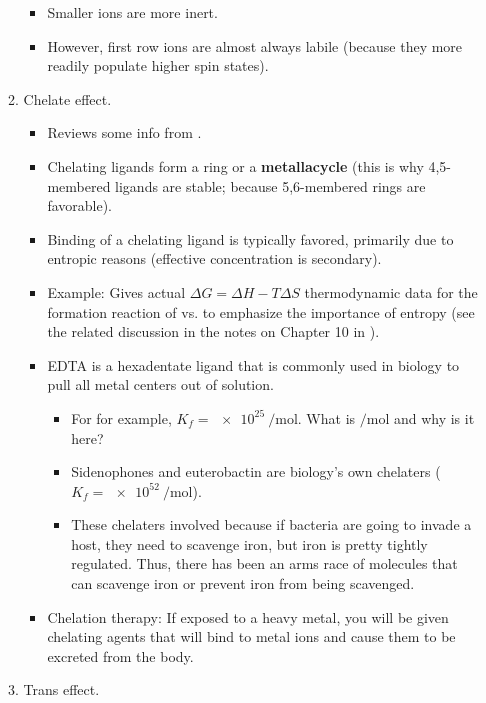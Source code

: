 \documentclass[../notes.tex]{subfiles}
\begin{document}
\begin{itemize}
\begin{enumerate}
\begin{itemize}
            \item Smaller ions are more inert.
            \item However, first row ions are almost always labile (because they more readily populate higher spin states).
        \end{itemize}
        \item Chelate effect.
        \begin{itemize}
            \item Reviews some info from \textcite{bib:CHEM20100Notes}.
            \item Chelating ligands form a ring or a \textbf{metallacycle} (this is why 4,5-membered ligands are stable; because 5,6-membered rings are favorable).
            \item Binding of a chelating ligand is typically favored, primarily due to entropic reasons (effective concentration is secondary).
            \item Example: Gives actual $\Delta G=\Delta H-T\Delta S$ thermodynamic data for the formation reaction of  vs.  to emphasize the importance of entropy (see the related discussion in the notes on Chapter 10 in \textcite{bib:CHEM20100Notes}).
            \item EDTA is a hexadentate ligand that is commonly used in biology to pull all metal centers out of solution.
            \begin{itemize}
                \item For  for example, $K_f=\SI{e25}{\per\mole}$. What is $\si{\per\mole}$ and why is it here?
                \item Sidenophones and euterobactin are biology's own chelaters ($K_f=\SI{e52}{\per\mole}$).
                \item These chelaters involved because if bacteria are going to invade a host, they need to scavenge iron, but iron is pretty tightly regulated. Thus, there has been an arms race of molecules that can scavenge iron or prevent iron from being scavenged.
            \end{itemize}
            \item Chelation therapy: If exposed to a heavy metal, you will be given chelating agents that will bind to metal ions and cause them to be excreted from the body.
        \end{itemize}
        \item Trans effect.
        \begin{itemize}

\end{itemize}
\end{enumerate}
\end{itemize}
\end{document}
